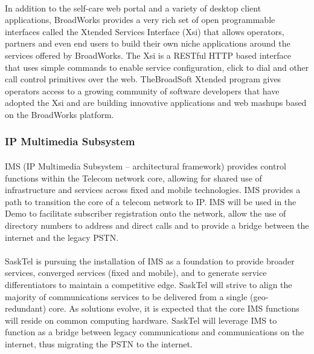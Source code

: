\documentclass[12pt]{article}
\begin{document}
 \paragraph{}
	In addition to the self-care web portal and a variety of desktop client applications, BroadWorks provides a very rich set of open programmable interfaces called the Xtended Services Interface (Xsi) that allows operators, partners and even end users to build their own niche applications around the services offered by BroadWorks.  The Xsi is a RESTful HTTP based interface that uses simple commands to enable service configuration, click to dial and other call control primitives over the web. TheBroadSoft Xtended program gives operators access to a growing community of software developers that have adopted the Xsi and are building innovative applications and web mashups based on the BroadWorks platform.

\subsubsection{IP Multimedia Subsystem}
\paragraph{}
	IMS (IP Multimedia Subsystem – architectural framework) provides control functions within the Telecom network core, allowing for shared use of infrastructure and services across fixed and mobile technologies.  IMS provides a path to transition the core of a telecom network to IP.  IMS will be used in the Demo to facilitate subscriber registration onto the network, allow the use of directory numbers to address and direct calls and to provide a bridge between the internet and the legacy PSTN.

\paragraph{}
	SaskTel is pursuing the installation of IMS as a foundation to provide broader services, converged services (fixed and mobile), and to generate service differentiators to maintain a competitive edge.  SaskTel will strive to align the majority of communications services to be delivered from a single (geo-redundant) core.  As solutions evolve, it is expected that the core IMS functions will reside on common computing hardware.  SaskTel will leverage IMS to function as a bridge between legacy communications and communications on the internet, thus migrating the PSTN to the internet.
\end{document}
